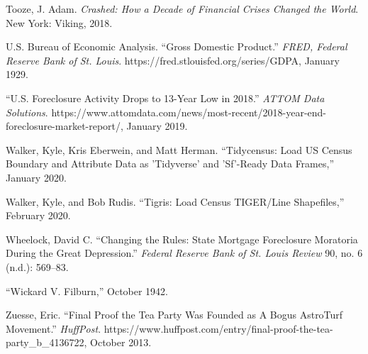 \documentclass[12pt,oneside]{psthesis}
\begin{document}
\leavevmode\hypertarget{ref-toozeCrashedHowDecade2018}{}%
Tooze, J. Adam. \emph{Crashed: How a Decade of Financial Crises Changed the World}. New York: Viking, 2018.

\leavevmode\hypertarget{ref-usbureauofeconomicanalysis1929gross}{}%
U.S. Bureau of Economic Analysis. ``Gross Domestic Product.'' \emph{FRED, Federal Reserve Bank of St. Louis}. https://fred.stlouisfed.org/series/GDPA, January 1929.

\leavevmode\hypertarget{ref-2019foreclosure}{}%
``U.S. Foreclosure Activity Drops to 13-Year Low in 2018.'' \emph{ATTOM Data Solutions}. https://www.attomdata.com/news/most-recent/2018-year-end-foreclosure-market-report/, January 2019.

\leavevmode\hypertarget{ref-walker2020tidycensus}{}%
Walker, Kyle, Kris Eberwein, and Matt Herman. ``Tidycensus: Load US Census Boundary and Attribute Data as 'Tidyverse' and 'Sf'-Ready Data Frames,'' January 2020.

\leavevmode\hypertarget{ref-walker2020tigris}{}%
Walker, Kyle, and Bob Rudis. ``Tigris: Load Census TIGER/Line Shapefiles,'' February 2020.

\leavevmode\hypertarget{ref-wheelockChangingRulesState2008}{}%
Wheelock, David C. ``Changing the Rules: State Mortgage Foreclosure Moratoria During the Great Depression.'' \emph{Federal Reserve Bank of St. Louis Review} 90, no. 6 (n.d.): 569--83.

\leavevmode\hypertarget{ref-1942wickard}{}%
``Wickard V. Filburn,'' October 1942.

\leavevmode\hypertarget{ref-zuesse2013final}{}%
Zuesse, Eric. ``Final Proof the Tea Party Was Founded as A Bogus AstroTurf Movement.'' \emph{HuffPost}. https://www.huffpost.com/entry/final-proof-the-tea-party\_b\_4136722, October 2013.


\end{document}
